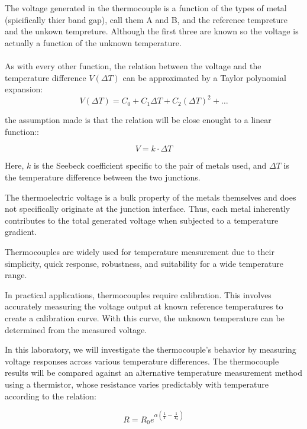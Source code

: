 \documentclass[12pt,a4paper]{report}
\begin{document}
The voltage generated in the thermocouple is a function of the types of metal (spicifically thier band gap), call them A and B, and  the reference tempreture and the unkown tempreture. Although the first three are known so the voltage is actually a function of the unknown temperature.

\paragraph{}
As with every other function, the relation between the voltage and the temperature difference $V(\Delta T)$ can be approximated by a Taylor polynomial expansion:
\begin{equation}
    V(\Delta T) = C_0 + C_1 \Delta T + C_2 (\Delta T)^2 + \ldots
\end{equation}

the assumption made is that the relation will be close enought to a linear function::

\begin{equation}
    V = k \cdot \Delta T
\end{equation}

Here, $k$ is the Seebeck coefficient specific to the pair of metals used, and $\Delta T$ is the temperature difference between the two junctions.

The thermoelectric voltage is a bulk property of the metals themselves and does not specifically originate at the junction interface. Thus, each metal inherently contributes to the total generated voltage when subjected to a temperature gradient.

Thermocouples are widely used for temperature measurement due to their simplicity, quick response, robustness, and suitability for a wide temperature range.

In practical applications, thermocouples require calibration. This involves accurately measuring the voltage output at known reference temperatures to create a calibration curve. With this curve, the unknown temperature can be determined from the measured voltage.

In this laboratory, we will investigate the thermocouple's behavior by measuring voltage responses across various temperature differences. The thermocouple results will be compared against an alternative temperature measurement method using a thermistor, whose resistance varies predictably with temperature according to the relation:

\begin{equation}
    R = R_0 e^{\alpha \left(\frac{1}{T} - \frac{1}{T_0}\right)}
\end{equation}
\end{document}
